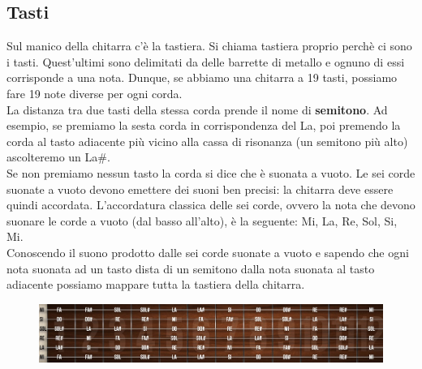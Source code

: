 \subsection{Tasti}
Sul manico della chitarra c’è la tastiera. Si chiama tastiera proprio perchè ci sono i tasti. Quest'ultimi sono delimitati da delle barrette di metallo e ognuno di essi corrisponde a una nota. Dunque, se abbiamo una chitarra a 19 tasti, possiamo fare 19 note diverse per ogni corda.\\
La distanza tra due tasti della stessa corda prende il nome di \textbf{semitono}. Ad esempio, se premiamo la sesta corda in corrispondenza del La, poi premendo la corda al tasto adiacente più vicino alla cassa di risonanza (un semitono più alto) ascolteremo un La\#.\\
Se non premiamo nessun tasto la corda si dice che è suonata a vuoto. Le sei corde suonate a vuoto devono emettere dei suoni ben precisi: la chitarra deve essere quindi accordata. L'accordatura classica delle sei corde, ovvero la nota che devono suonare le corde a vuoto (dal basso all'alto), è la seguente: Mi, La, Re, Sol, Si, Mi.\\
Conoscendo il suono prodotto dalle sei corde suonate a vuoto e sapendo che ogni nota suonata ad un tasto dista di un semitono dalla nota suonata al tasto adiacente possiamo mappare tutta la tastiera della chitarra.
\begin{figure}[H]
	\centering
	\includegraphics[scale=0.60]{./images/img13.jpg}
\end{figure}

